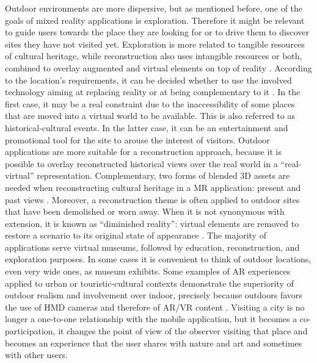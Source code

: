 Outdoor environments are more dispersive, but as mentioned before, one of the goals of mixed reality applications is exploration. Therefore it might be relevant to guide users towards the place they are looking for \cite{jenny_enhancing_2017} or to drive them to discover sites they have not visited yet. Exploration is more related to tangible resources of cultural heritage, while reconstruction also uses intangible resources or both, combined to overlay augmented and virtual elements on top of reality \cite{bekele_survey_2018}. According to the location's requirements, it can be decided whether to use the involved technology aiming at replacing reality or at being complementary to it \cite{racz_virtual_2019}. In the first case, it may be a real constraint due to the inaccessibility of some places that are moved into a virtual world to be available. This is also referred to as historical-cultural events. In the latter case, it can be an entertainment and promotional tool for the site to arouse the interest of visitors.
Outdoor applications are more suitable for a reconstruction approach, because it is possible to overlay reconstructed historical views over the real world in a “real-virtual” representation. Complementary, two forms of blended 3D assets are needed when reconstructing cultural heritage in a MR application: present and past views \cite{bekele_survey_2018}. Moreover, a reconstruction theme is often applied to outdoor sites that have been demolished or worn away. When it is not synonymous with extension, it is known as “diminished reality”: virtual elements are removed to restore a scenario to its original state of appearance \cite{honkanen_enhancing_2018}. 
The majority of applications serve virtual museums, followed by education, reconstruction, and exploration purposes.
In some cases it is convenient to think of outdoor locations, even very wide ones, as museum exhibits. 
Some examples of AR experiences applied to urban or touristic-cultural contexts demonstrate the superiority of outdoor realism and involvement over indoor, precisely because outdoors favors the use of \gls{HMD} cameras and therefore of AR/VR content \cite{iacoviello_holocities_2020}. Visiting a city is no longer a one-to-one relationship with the mobile application, but it becomes a co-participation, it changes the point of view of the observer visiting that place and becomes an experience that the user shares with nature and art and sometimes with other users.
